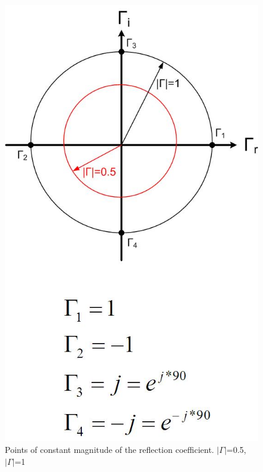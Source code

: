 \documentclass{ximera}
\begin{document}
\begin{figure}[htbp]
\begin{center}
\includegraphics[scale=0.3]{../jpg/smithchartreflection.jpg}
\end{center}
\caption{Points of constant magnitude of the reflection coefficient. $ | \Gamma | $=0.5, $ | \Gamma |$=1}
\label{scswr1}
\end{figure}
\end{document}
